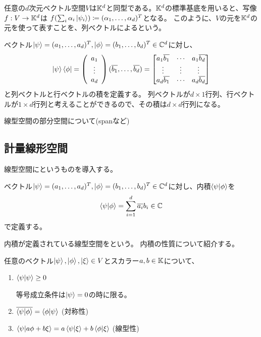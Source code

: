 任意の$d$次元ベクトル空間$V$は$\mathbb{K}^d$と同型である。$\mathbb{K}^d$の標準基底を用いると、写像$f:V\to\mathbb{K}^d$は
$f(\sum_i \alpha_i\ket{\psi_i})\coloneqq(\alpha_1,\ldots,\alpha_d)^T$となる。
このように、$V$の元を$\mathbb{K}^d$の元を使って表すことを、列ベクトルによるという。


\begin{Def}
  ベクトル$\ket{\psi} = (a_1,\ldots,a_d)^T, \ket{\phi} = (b_1,\ldots,b_d)^T \in \mathbb{C}^d$に対し、
  $$
    \ket{\psi}\bra{\phi} =
    \left(\begin{array}{c} a_1\\ \vdots \\ a_d \end{array}\right)(\overline{b_1},\ldots,\overline{b_d}) =
    \begin{bmatrix}
    a_1\overline{b_1} & \cdots & a_1\overline{b_d} \\
    \vdots & \vdots & \vdots \\
    a_d\overline{b_1} & \cdots & a_d\overline{b_d} \\
    \end{bmatrix}
  $$
  と列ベクトルと行ベクトルの積を定義する。
  列ベクトルが$d\times 1$行列、行ベクトルが$1\times d$行列と考えることができるので、その積は$d\times d$行列になる。
\end{Def}

\begin{Memo}
  線型空間の部分空間について(spanなど)
\end{Memo}

\subsection{計量線形空間}
線型空間にというものを導入する。
\begin{Def}
  ベクトル$\ket{\psi} = (a_1,\ldots,a_d)^T, \ket{\phi} = (b_1,\ldots,b_d)^T \in \mathbb{C}^d$に対し、内積$\braket{\psi|\phi}$を
  $$
  \braket{\psi|\phi} = \sum_{i=1}^d \overline{a_i}b_i \in \mathbb{C}
  $$
  で定義する。
\end{Def}

内積が定義されている線型空間をという。
内積の性質について紹介する。
\begin{Prop}
  任意のベクトル$\ket{\psi},\ket{\phi},\ket{\xi} \in V$とスカラー$a,b\in\mathbb{K}$について、
  \begin{enumerate}
    \item $\braket{\psi|\psi} \geq 0$

    等号成立条件は$\ket{\psi} = 0$の時に限る。

    \item $\overline{\braket{\psi|\phi}} = \braket{\phi|\psi}$ (対称性)

    \item $\braket{\psi|a\phi + b\xi} = a\braket{\psi|\xi} + b\braket{\phi|\xi}$ (線型性)
  \end{enumerate}
\end{Prop}

